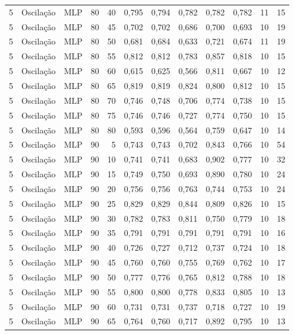 \begin{longtable}{@{}rllrrrrrrrrr@{}}
5 & Oscilação & MLP & 80 & 40 & 0,795 & 0,794 & 0,782 & 0,782 & 0,782 & 11 & 15 \\
5 & Oscilação & MLP & 80 & 45 & 0,702 & 0,702 & 0,686 & 0,700 & 0,693 & 10 & 19 \\
5 & Oscilação & MLP & 80 & 50 & 0,681 & 0,684 & 0,633 & 0,721 & 0,674 & 11 & 19 \\
5 & Oscilação & MLP & 80 & 55 & 0,812 & 0,812 & 0,783 & 0,857 & 0,818 & 10 & 15 \\
5 & Oscilação & MLP & 80 & 60 & 0,615 & 0,625 & 0,566 & 0,811 & 0,667 & 10 & 12 \\
5 & Oscilação & MLP & 80 & 65 & 0,819 & 0,819 & 0,824 & 0,800 & 0,812 & 10 & 15 \\
5 & Oscilação & MLP & 80 & 70 & 0,746 & 0,748 & 0,706 & 0,774 & 0,738 & 10 & 15 \\
5 & Oscilação & MLP & 80 & 75 & 0,746 & 0,746 & 0,727 & 0,774 & 0,750 & 10 & 15 \\
5 & Oscilação & MLP & 80 & 80 & 0,593 & 0,596 & 0,564 & 0,759 & 0,647 & 10 & 14 \\
5 & Oscilação & MLP & 90 & 5 & 0,743 & 0,743 & 0,702 & 0,843 & 0,766 & 10 & 54 \\
5 & Oscilação & MLP & 90 & 10 & 0,741 & 0,741 & 0,683 & 0,902 & 0,777 & 10 & 32 \\
5 & Oscilação & MLP & 90 & 15 & 0,749 & 0,750 & 0,693 & 0,890 & 0,780 & 10 & 24 \\
5 & Oscilação & MLP & 90 & 20 & 0,756 & 0,756 & 0,763 & 0,744 & 0,753 & 10 & 24 \\
5 & Oscilação & MLP & 90 & 25 & 0,829 & 0,829 & 0,844 & 0,809 & 0,826 & 10 & 15 \\
5 & Oscilação & MLP & 90 & 30 & 0,782 & 0,783 & 0,811 & 0,750 & 0,779 & 10 & 18 \\
5 & Oscilação & MLP & 90 & 35 & 0,791 & 0,791 & 0,791 & 0,791 & 0,791 & 10 & 16 \\
5 & Oscilação & MLP & 90 & 40 & 0,726 & 0,727 & 0,712 & 0,737 & 0,724 & 10 & 18 \\
5 & Oscilação & MLP & 90 & 45 & 0,760 & 0,760 & 0,755 & 0,769 & 0,762 & 10 & 17 \\
5 & Oscilação & MLP & 90 & 50 & 0,777 & 0,776 & 0,765 & 0,812 & 0,788 & 10 & 18 \\
5 & Oscilação & MLP & 90 & 55 & 0,800 & 0,800 & 0,778 & 0,833 & 0,805 & 10 & 13 \\
5 & Oscilação & MLP & 90 & 60 & 0,731 & 0,731 & 0,737 & 0,718 & 0,727 & 10 & 19 \\
5 & Oscilação & MLP & 90 & 65 & 0,764 & 0,760 & 0,717 & 0,892 & 0,795 & 10 & 13 \\

\end{longtable}
